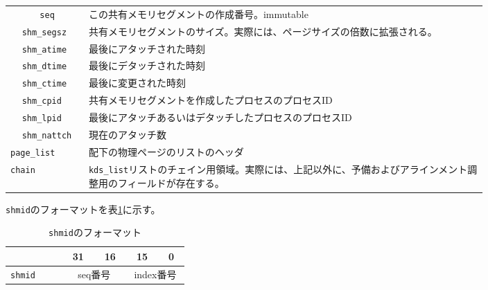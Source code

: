 \documentclass[twoside,11pt,fleqn]{book}
\begin{document}
{\begin{table}[!htb]
\begin{tabular}{|p{0.02\linewidth}|p{0.02\linewidth}|p{0.06\linewidth}|p{0.70\linewidth}|}
&&\texttt{seq}&この共有メモリセグメントの作成番号。immutable\\ \cline{2-4}
&\multicolumn{2}{l|}{\texttt{shm\_segsz}}&共有メモリセグメントのサイズ。実際には、ページサイズの倍数に拡張される。\\ \cline{2-4}
&\multicolumn{2}{l|}{\texttt{shm\_atime}}&最後にアタッチされた時刻\\ \cline{2-4}
&\multicolumn{2}{l|}{\texttt{shm\_dtime}}&最後にデタッチされた時刻\\ \cline{2-4}
&\multicolumn{2}{l|}{\texttt{shm\_ctime}}&最後に変更された時刻\\ \cline{2-4}
&\multicolumn{2}{l|}{\texttt{shm\_cpid}}&共有メモリセグメントを作成したプロセスのプロセスID\\ \cline{2-4}
&\multicolumn{2}{l|}{\texttt{shm\_lpid}}&最後にアタッチあるいはデタッチしたプロセスのプロセスID\\ \cline{2-4}
&\multicolumn{2}{l|}{\texttt{shm\_nattch}}&現在のアタッチ数\\ \cline{1-4}
\multicolumn{3}{l|}{\texttt{page\_list}}&配下の物理ページのリストのヘッダ\\ \hline
\multicolumn{3}{l|}{\texttt{chain}}&\texttt{kds\_list}リストのチェイン用領域。実際には、上記以外に、予備およびアラインメント調整用のフィールドが存在する。\\ \hline
\end{tabular}
\vspace{-0em}
\end{table}
\FloatBarrier

\texttt{shmid}のフォーマットを表\ref{tab:shmid}に示す。

\begin{table}[!htb]
\centering
\footnotesize
\caption{\texttt{shmid}のフォーマット}\vspace{0.0em}
\label{tab:shmid}
\begin{tabular}{|p{0.10\linewidth}|p{0.05\linewidth}|p{0.05\linewidth}|p{0.05\linewidth}|p{0.05\linewidth}|} \hline
&\multicolumn{1}{|c}{31}&\multicolumn{1}{|c}{16}&\multicolumn{1}{|c}{15}&\multicolumn{1}{|c|}{0}\\ \hline
\texttt{shmid}&\multicolumn{2}{|c}{seq番号}&\multicolumn{2}{|c|}{index番号}\\ \hline
\end{tabular}
\vspace{-0em}
\end{table}
\FloatBarrier
}

\subsubsection{}
\end{document}
